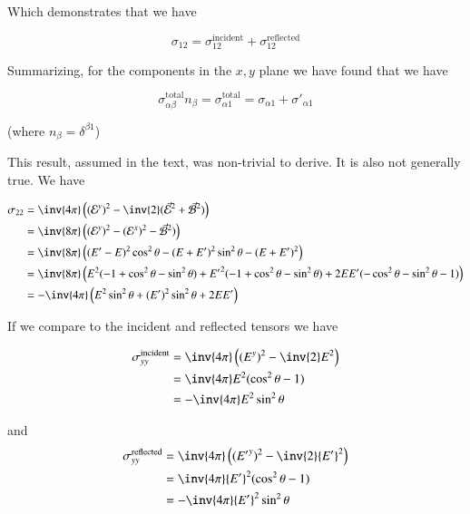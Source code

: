 Which demonstrates that we have

\begin{equation}\label{eqn:relativisticElectrodynamicsT9:640}
\sigma_{12} = \sigma_{12}^{\text{incident}} + \sigma_{12}^{\text{reflected}} 
\end{equation}

Summarizing, for the components in the $x,y$ plane we have found that we have

\begin{equation}\label{eqn:relativisticElectrodynamicsT9:210}
\sigma_{\alpha\beta}^{\text{total}} n_\beta = \sigma_{\alpha 1 }^{\text{total}} = \sigma_{\alpha 1} + {\sigma'}_{\alpha 1}
\end{equation}

(where $n_\beta = \delta^{\beta 1}$)

This result, assumed in the text, was non-trivial to derive.  It is also not generally true.  We have 

\begin{align*}
\sigma_{2 2} 
&= \inv{4 \pi} \left( (\mathcal{E}^y)^2 - \inv{2} ( \vec{\mathcal{E}}^2 + \vec{\mathcal{B}}^2 ) \right) \\
&= \inv{8 \pi} \left( (\mathcal{E}^y)^2 - (\mathcal{E}^x)^2 - \vec{\mathcal{B}}^2 ) \right) \\
&= \inv{8 \pi} \left( 
(E' - E)^2 \cos^2\theta - (E + E')^2 \sin^2\theta - (E + E')^2
\right) \\
&= \inv{8 \pi} \left( 
E^2 ( -1 + \cos^2 \theta - \sin^2\theta )
+{E'}^2 ( -1 + \cos^2 \theta - \sin^2\theta )
+ 2 E E' ( -\cos^2\theta - \sin^2\theta -1 ) \right) \\
&= -\inv{4 \pi} \left( E^2 \sin^2 \theta + (E')^2 \sin^2 \theta + 2 E E' \right)
\end{align*}

If we compare to the incident and reflected tensors we have

\begin{align*}
\sigma_{y y}^{\text{incident}} 
&= \inv{4 \pi} \left( (E^y)^2 -\inv{2} E^2 \right) \\
&= \inv{4 \pi} E^2 ( \cos^2\theta - 1 ) \\
&= -\inv{4 \pi} E^2 \sin^2\theta 
\end{align*}

and
\begin{align*}
\sigma_{y y}^{\text{reflected}} 
&= \inv{4 \pi} \left( ({E'}^y)^2 -\inv{2} {E'}^2 \right) \\
&= \inv{4 \pi} {E'}^2 ( \cos^2\theta - 1 ) \\
&= -\inv{4 \pi} {E'}^2 \sin^2\theta 
\end{align*}

